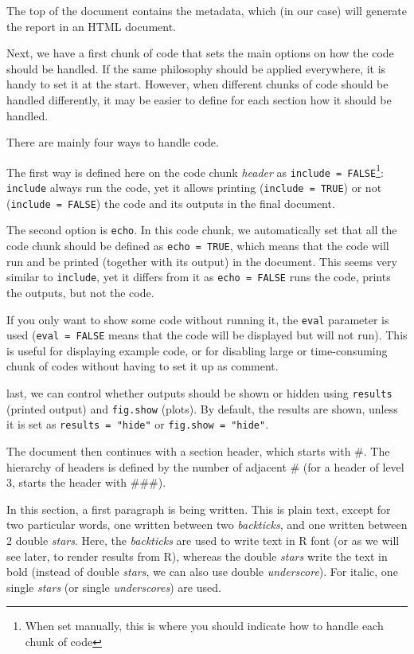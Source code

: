 \documentclass[
]{book}
\begin{document}
The top of the document contains the metadata, which (in our case) will generate the report in an HTML document.

Next, we have a first chunk of code that sets the main options on how the code should be handled. If the same philosophy should be applied everywhere, it is handy to set it at the start. However, when different chunks of code should be handled differently, it may be easier to define for each section how it should be handled.

There are mainly four ways to handle code.

The first way is defined here on the code chunk \emph{header} as \texttt{include\ =\ FALSE}\footnote{When set manually, this is where you should indicate how to handle each chunk of code}: \texttt{include} always run the code, yet it allows printing (\texttt{include\ =\ TRUE}) or not (\texttt{include\ =\ FALSE}) the code and its outputs in the final document.

The second option is \texttt{echo}. In this code chunk, we automatically set that all the code chunk should be defined as \texttt{echo\ =\ TRUE}, which means that the code will run and be printed (together with its output) in the document. This seems very similar to \texttt{include}, yet it differs from it as \texttt{echo\ =\ FALSE} runs the code, prints the outputs, but not the code.

If you only want to show some code without running it, the \texttt{eval} parameter is used (\texttt{eval\ =\ FALSE} means that the code will be displayed but will not run). This is useful for displaying example code, or for disabling large or time-consuming chunk of codes without having to set it up as comment.

last, we can control whether outputs should be shown or hidden using \texttt{results} (printed output) and \texttt{fig.show} (plots). By default, the results are shown, unless it is set as \texttt{results\ =\ "hide"} or \texttt{fig.show\ =\ "hide"}.

The document then continues with a section header, which starts with \#. The hierarchy of headers is defined by the number of adjacent \# (for a header of level 3, starts the header with \#\#\#).

In this section, a first paragraph is being written. This is plain text, except for two particular words, one written between two \emph{backticks}, and one written between 2 double \emph{stars}. Here, the \emph{backticks} are used to write text in R font (or as we will see later, to render results from R), whereas the double \emph{stars} write the text in bold (instead of double \emph{stars}, we can also use double \emph{underscore}). For italic, one single \emph{stars} (or single \emph{underscores}) are used.
\end{document}
